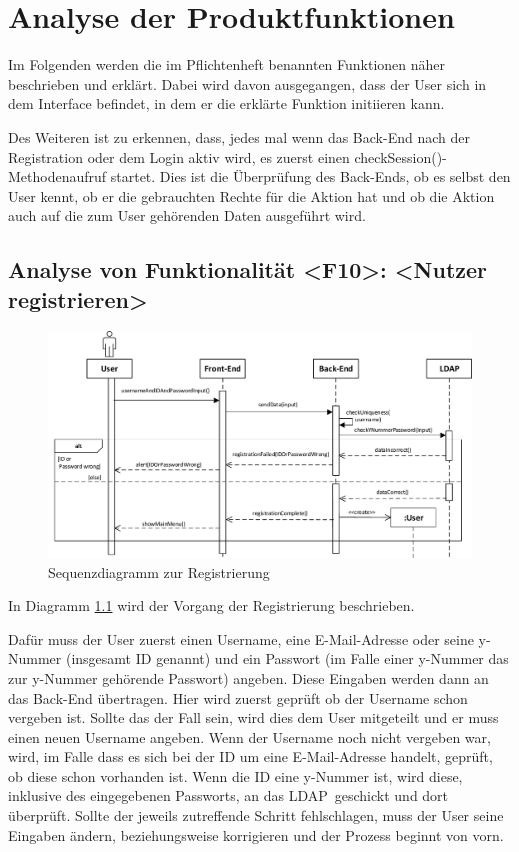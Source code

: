 
\chapter{Analyse der Produktfunktionen}\label{chap:analyse}

Im Folgenden werden die im Pflichtenheft benannten Funktionen näher beschrieben und erkl\"art. Dabei wird davon ausgegangen, dass der User sich in dem Interface befindet, in dem er die erklärte Funktion initiieren kann.

Des Weiteren ist zu erkennen, dass, jedes mal wenn das Back-End nach der Registration oder dem Login aktiv wird, es zuerst einen \glqq checkSession()\grqq -Methodenaufruf startet. Dies ist die Überprüfung des Back-Ends, ob es selbst den User kennt, ob er die gebrauchten Rechte für die Aktion hat und ob die Aktion auch auf die zum User gehörenden Daten ausgeführt wird.

\newpage
\section{Analyse von Funktionalität <F10>: <Nutzer registrieren>}
\label{sequence_f10}
\begin{figure}[htb]
\includegraphics[width=1\textwidth]{figures/sequenz_F10.pdf}
\caption{Sequenzdiagramm zur Registrierung}
\end{figure}

In Diagramm \ref{sequence_f10} wird der Vorgang der Registrierung beschrieben.

Dafür muss der User zuerst einen Username, eine E-Mail-Adresse oder seine y-Nummer (insgesamt ID genannt) und ein Passwort (im Falle einer y-Nummer das zur y-Nummer gehörende Passwort) angeben. Diese Eingaben werden dann an das Back-End übertragen. Hier wird zuerst geprüft ob der Username schon vergeben ist. Sollte das der Fall sein, wird dies dem User mitgeteilt und er muss einen neuen Username angeben.
Wenn der Username noch nicht vergeben war, wird, im Falle dass es sich bei der ID um eine E-Mail-Adresse handelt, geprüft, ob diese schon vorhanden ist. Wenn die ID eine y-Nummer ist, wird diese, inklusive des eingegebenen Passworts, an das \glqq LDAP\grqq ~geschickt und dort überprüft. Sollte der jeweils zutreffende Schritt fehlschlagen, muss der User seine Eingaben ändern, beziehungsweise korrigieren und der Prozess beginnt von vorn.

